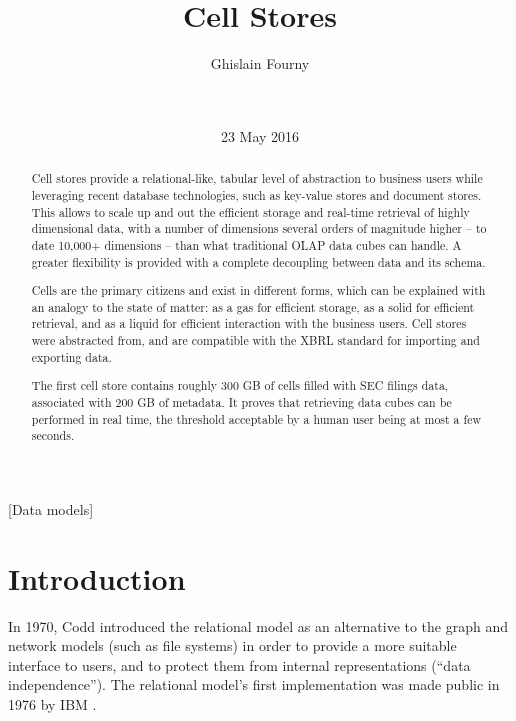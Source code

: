 \documentclass{acm_proc_article-sp}
\begin{document}
\title{Cell Stores}


\author{
Ghislain Fourny\\
       \\
       \\
}
\date{23 May 2016}
\maketitle

\begin{abstract}
Cell stores provide a relational-like, tabular level of abstraction to business users while leveraging recent database technologies, such as key-value stores and document stores. This allows to scale up and out the efficient storage and real-time retrieval of highly dimensional data, with a number of dimensions several orders of magnitude higher -- to date 10,000+ dimensions -- than what traditional OLAP data cubes can handle. A greater flexibility is provided with a complete decoupling between data and its schema.

Cells are the primary citizens and exist in different forms, which can be explained with an analogy to the state of matter: as a gas for efficient storage, as a solid for efficient retrieval, and as a liquid for efficient interaction with the business users. Cell stores were abstracted from, and are compatible with the XBRL standard for importing and exporting data.

The first cell store contains roughly 300 GB of cells filled with SEC filings data, associated with 200 GB of metadata. It proves that retrieving data cubes can be performed in real time, the threshold acceptable by a human user being at most a few seconds.
\end{abstract}

[Data models]



\section{Introduction}
In 1970, Codd \cite{Codd1970} introduced the relational model as an alternative to the graph and network models (such as file systems) in order to provide a more suitable interface to users, and to protect them from internal representations (``data independence''). The relational model's first implementation was made public in 1976 by IBM \cite{Astrahan1976}.
\end{document}
